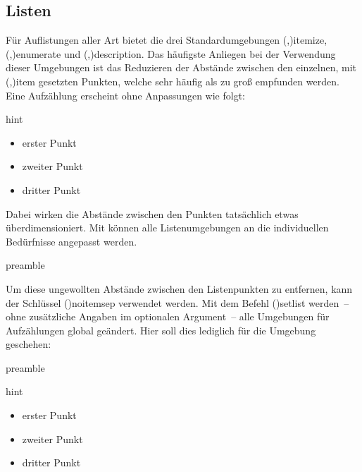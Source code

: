 \documentclass[%
  english,ngerman,%
  cdgeometry=no,DIV=12,%
  cd=false,cdfont=false,cdtitle=true,%
  headings=normal,%
  automark,%
  listof=toc,%
]{tudscrartcl}
\begin{document}
\subsection{%
  Listen%
  \label{sec:lists}%
}

Für Auflistungen aller Art bietet  die drei Standardumgebungen 
\Environment(,){itemize},
\Environment(,){enumerate} und
\Environment(,){description}. Das 
häufigste Anliegen bei der Verwendung dieser Umgebungen ist das Reduzieren 
der Abstände zwischen den einzelnen, mit 
\Macro(,){item} gesetzten Punkten, 
welche sehr häufig als zu groß empfunden werden. Eine Aufzählung erscheint ohne 
Anpassungen wie folgt:
%
\begin{Code}[input]{hint}
\begin{itemize}
\item erster Punkt
\item zweiter Punkt
\item dritter Punkt
\end{itemize}
\end{Code}

Dabei wirken die Abstände zwischen den Punkten tatsächlich etwas 
überdimensioniert. Mit  können alle Listenumgebungen an die 
individuellen Bedürfnisse angepasst werden. 
%
\begin{Code}{preamble}
\usepackage{enumitem}
\end{Code}

Um diese ungewollten Abstände zwischen den Listenpunkten zu entfernen, kann der 
Schlüssel \Option(){noitemsep} verwendet werden. Mit dem 
Befehl \Macro(){setlist} werden~-- ohne zusätzliche Angaben 
im optionalen Argument~-- alle Umgebungen für Aufzählungen global geändert. 
Hier soll dies lediglich für die Umgebung  geschehen:
%
\begin{Code}[input]{preamble}

\end{Code}
\begin{Code}[input]{hint}
\begin{itemize}
\item erster Punkt
\item zweiter Punkt
\item dritter Punkt
\end{itemize}

\end{Code}
\end{document}
